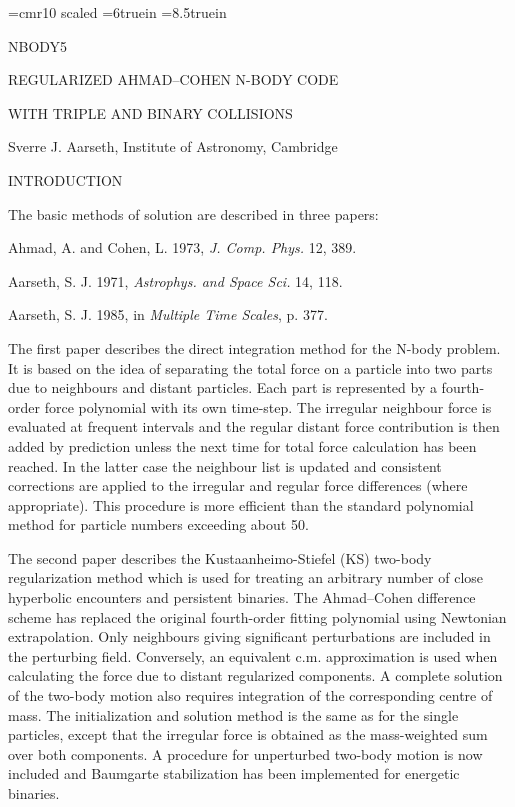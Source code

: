 \font\big=cmr10 scaled 
\vglue 1.5cm
\hsize=6truein
\vsize=8.5truein
\centerline {\big NBODY5}
\bigskip
\bigskip
\centerline {REGULARIZED AHMAD--COHEN N-BODY CODE}
\medskip
\centerline {WITH TRIPLE AND BINARY COLLISIONS}
\bigskip
\centerline {Sverre J. Aarseth, Institute of Astronomy, Cambridge}
\bigskip
\bigskip
\centerline {INTRODUCTION}
\bigskip

         The basic methods of solution are described in three papers:
\parindent 40pt
\bigskip

             Ahmad, A. and Cohen, L. 1973, {\it J. Comp. Phys.} 12, 389.

             Aarseth, S. J. 1971, {\it Astrophys. and Space Sci.} 14, 118.

             Aarseth, S. J. 1985, in {\it Multiple Time Scales}, p. 377.
\bigskip
\parindent 12pt

       The first paper describes the direct integration method for the N-body
    problem.  It is based on the idea of separating the total force on a
    particle into two parts due to neighbours and distant particles.  Each part
    is represented by a fourth-order force polynomial with its own
    time-step.  The irregular
       neighbour force is evaluated at frequent intervals and the
    regular distant force contribution is then added by prediction unless the
    next time for total force calculation has been reached.  In the latter case
    the neighbour list is updated and consistent corrections are applied to the
    irregular and regular force differences (where appropriate).  This procedure
 is more efficient than the standard polynomial method for particle
    numbers exceeding about 50.

   The second paper describes the Kustaanheimo-Stiefel (KS) two-body
    regularization method which is used for treating an arbitrary number of
    close hyperbolic encounters and persistent binaries.  The Ahmad--Cohen
 difference scheme has replaced the original fourth-order fitting polynomial
 using Newtonian extrapolation.  Only
 neighbours giving significant perturbations are included in the
    perturbing field.  Conversely, an equivalent c.m. approximation is used when
 calculating the force due to distant regularized components.  A
 complete solution of the two-body
    motion also requires integration of the corresponding centre of mass.  The
    initialization and solution method is the same as for the single particles,
    except that the irregular force is obtained as the mass-weighted sum over
 both components.  A procedure for unperturbed two-body motion is now included
 and Baumgarte stabilization has been implemented for energetic binaries.

